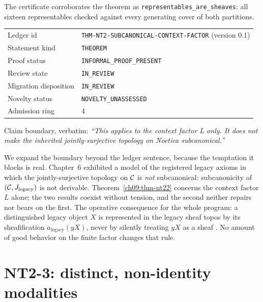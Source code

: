 The certificate corroborates the theorem as \texttt{representables\_are\_sheaves}: all sixteen representables checked against every generating cover of both partitions.

\begin{remark}\label{ch09:rem-ledger-nt22}
\begin{center}
\begin{tabular}{@{}ll@{}}
\toprule
Ledger id & \texttt{THM-NT2-SUBCANONICAL-CONTEXT-FACTOR} (version 0.1) \\
Statement kind & \texttt{THEOREM} \\
Proof status & \texttt{INFORMAL\_PROOF\_PRESENT} \\
Review state & \texttt{IN\_REVIEW} \\
Migration disposition & \texttt{IN\_REVIEW} \\
Novelty status & \texttt{NOVELTY\_UNASSESSED} \\
Admission ring & 4 \\
\bottomrule
\end{tabular}
\end{center}
Claim boundary, verbatim: \emph{``This applies to the context factor L only. It does not make the inherited jointly-surjective topology on Noetica subcanonical.''}
\end{remark}

\begin{boundary}\label{ch09:boundary-nt22}
We expand the boundary beyond the ledger sentence, because the temptation it blocks is real. Chapter~6 exhibited a model of the registered legacy axioms in which the jointly-surjective topology on $\mathcal{C}$ is \emph{not} subcanonical: subcanonicity of $(\mathcal{C},J_{\mathrm{legacy}})$ is not derivable. Theorem~\ref{ch09:thm-nt22} concerns the context factor $L$ alone; the two results coexist without tension, and the second neither repairs nor bears on the first. The operative consequence for the whole program: a distinguished legacy object $X$ is represented in the legacy sheaf topos by its sheafification $a_{\mathrm{legacy}}(yX)$, never by silently treating $yX$ as a sheaf \cite{stacks00WO}. No amount of good behavior on the finite factor changes that rule.
\end{boundary}

\section{NT2-3: distinct, non-identity modalities}\label{ch09:sec-nt23}

